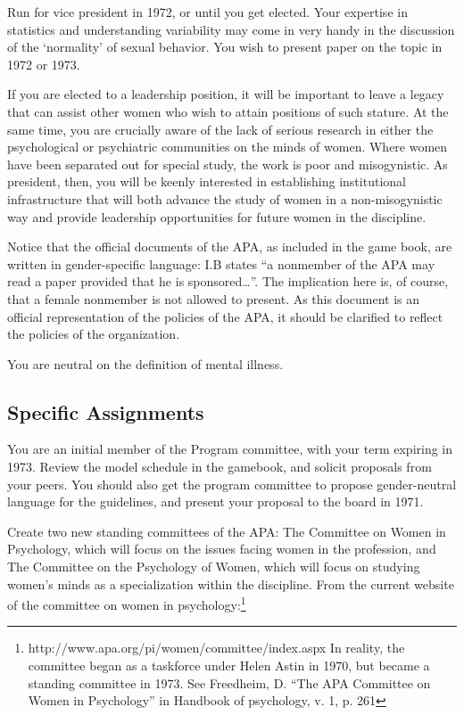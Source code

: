 \begin{refsection}
Run for vice president in 1972, or until you get elected. Your expertise in statistics and understanding variability may come in very handy in the discussion of the `normality' of sexual behavior. You wish to present paper on the topic in 1972 or 1973.

If you are elected to a leadership position, it will be important to leave a legacy that can assist other women who wish to attain positions of such stature. At the same time, you are crucially aware of the lack of serious research in either the psychological or psychiatric communities on the minds of women. Where women have been separated out for special study, the work is poor and misogynistic. As president, then, you will be keenly interested in establishing institutional infrastructure that will both advance the study of women in a non-misogynistic way and provide leadership opportunities for future women in the discipline.

Notice that the official documents of the APA, as included in the game book, are written in gender-specific language: I.B states ``a nonmember of the APA may read a paper provided that he is sponsored{\ldots}''. The implication here is, of course, that a female nonmember is not allowed to present. As this document is an official representation of the policies of the APA, it should be clarified to reflect the policies of the organization.

You are neutral on the definition of mental illness. 

\subsection{Specific Assignments}
\label{specificassignments}

You are an initial member of the Program committee, with your term expiring in 1973. Review the model schedule in the gamebook, and solicit proposals from your peers. You should also get the program committee to propose gender-neutral language for the guidelines, and present your proposal to the board in 1971. 

Create two new standing committees of the APA: The Committee on Women in Psychology, which will focus on the issues facing women in the profession, and The Committee on the Psychology of Women, which will focus on studying women's minds as a specialization within the discipline. From the current website of the committee on women in psychology:\footnote{http:\slash \slash www.apa.org\slash pi\slash women\slash committee\slash index.aspx In reality, the committee began as a taskforce under Helen Astin in 1970, but became a standing committee in 1973. See Freedheim, D. ``The APA Committee on Women in Psychology'' in Handbook of psychology, v. 1, p. 261}


\end{refsection}
